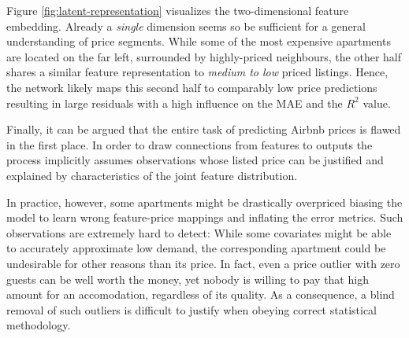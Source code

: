 \documentclass[12pt, letterpaper]{article}
\begin{document}
Figure \ref{fig:latent-representation} visualizes the two-dimensional feature embedding.
Already a \emph{single} dimension seems so be sufficient for a general understanding of price segments.
While some of the most expensive apartments are located on the far left, surrounded by highly-priced neighbours, the other half shares a similar feature representation to \emph{medium to low} priced listings.
Hence, the network likely maps this second half to comparably low price predictions resulting in large residuals with a high influence on the MAE and the $R^2$ value.

Finally, it can be argued that the entire task of predicting Airbnb prices is flawed in the first place.
In order to draw connections from features to outputs the process implicitly assumes observations whose listed price can be justified and explained by characteristics of the joint feature distribution.

In practice, however, some apartments might be drastically overpriced biasing the model to learn wrong feature-price mappings and inflating the error metrics.
Such observations are extremely hard to detect:
While some covariates might be able to accurately approximate low demand, the corresponding apartment could be undesirable for other reasons than its price.
In fact, even a price outlier with zero guests can be well worth the money, yet nobody is willing to pay that high amount for an accomodation, regardless of its quality.
As a consequence, a blind removal of such outliers is difficult to justify when obeying correct statistical methodology.

\newpage



\end{document}
